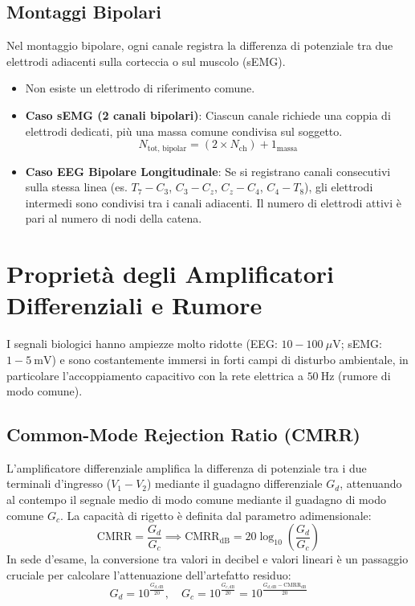 \documentclass[10pt, letterpaper]{report}
\begin{document}
\subsection{Montaggi Bipolari}
Nel montaggio bipolare, ogni canale registra la differenza di potenziale tra due elettrodi adiacenti sulla corteccia o sul muscolo (sEMG).
\begin{itemize}
    \item Non esiste un elettrodo di riferimento comune.
    \item \textbf{Caso sEMG (2 canali bipolari)}: Ciascun canale richiede una coppia di elettrodi dedicati, più una massa comune condivisa sul soggetto.
    \[
    N_{\text{tot, bipolar}} = (2 \times N_{\text{ch}}) + 1_{\text{massa}}
    \]
    \item \textbf{Caso EEG Bipolare Longitudinale}: Se si registrano canali consecutivi sulla stessa linea (es. $T_7-C_3$, $C_3-C_z$, $C_z-C_4$, $C_4-T_8$), gli elettrodi intermedi sono condivisi tra i canali adiacenti.
    Il numero di elettrodi attivi è pari al numero di nodi della catena.
\end{itemize}

\section{Proprietà degli Amplificatori Differenziali e Rumore}
I segnali biologici hanno ampiezze molto ridotte (EEG: $10-100\ \mu\text{V}$; sEMG: $1-5\ \text{mV}$) e sono costantemente immersi in forti campi di disturbo ambientale, in particolare l'accoppiamento capacitivo con la rete elettrica a $50\ \text{Hz}$ (rumore di modo comune).

\subsection{Common-Mode Rejection Ratio (CMRR)}
L'amplificatore differenziale amplifica la differenza di potenziale tra i due terminali d'ingresso ($V_1 - V_2$) mediante il guadagno differenziale $G_d$, attenuando al contempo il segnale medio di modo comune mediante il guadagno di modo comune $G_c$.
La capacità di rigetto è definita dal parametro adimensionale:
\[
\text{CMRR} = \frac{G_d}{G_c} \implies \text{CMRR}_{\text{dB}} = 20\log_{10}\left(\frac{G_d}{G_c}\right)
\]
In sede d'esame, la conversione tra valori in decibel e valori lineari è un passaggio cruciale per calcolare l'attenuazione dell'artefatto residuo:
\[
G_d = 10^{\frac{G_{d,\text{dB}}}{20}}, \quad G_c = 10^{\frac{G_{c,\text{dB}}}{20}} = 10^{\frac{G_{d,\text{dB}} - \text{CMRR}_{\text{dB}}}{20}}
\]
\end{document}
